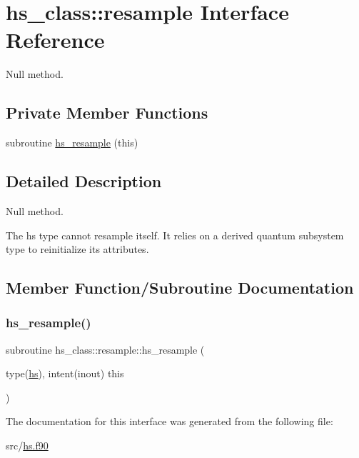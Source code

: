 \hypertarget{interfacehs__class_1_1resample}{}\section{hs\+\_\+class\+:\+:resample Interface Reference}
\label{interfacehs__class_1_1resample}


Null method.  


\subsection*{Private Member Functions}
\begin{DoxyCompactItemize}
\item 
subroutine \hyperlink{interfacehs__class_1_1resample_aa12c24bc50e0289218cec370b23e4ca1}{hs\+\_\+resample} (this)
\end{DoxyCompactItemize}


\subsection{Detailed Description}
Null method. 

The hs type cannot resample itself. It relies on a derived quantum subsystem type to reinitialize its attributes. 

\subsection{Member Function/\+Subroutine Documentation}
\mbox{\label{interfacehs__class_1_1resample_aa12c24bc50e0289218cec370b23e4ca1}} 
\subsubsection{\texorpdfstring{hs\+\_\+resample()}{hs\_resample()}}
{\footnotesize\ttfamily subroutine hs\+\_\+class\+::resample\+::hs\+\_\+resample (\begin{DoxyParamCaption}\item[{type(\hyperlink{strucths__class_1_1hs}{hs}), intent(inout)}]{this }\end{DoxyParamCaption})\hspace{0.3cm}{\ttfamily [private]}}



The documentation for this interface was generated from the following file\+:\begin{DoxyCompactItemize}
\item 
src/\hyperlink{hs_8f90}{hs.\+f90}\end{DoxyCompactItemize}
